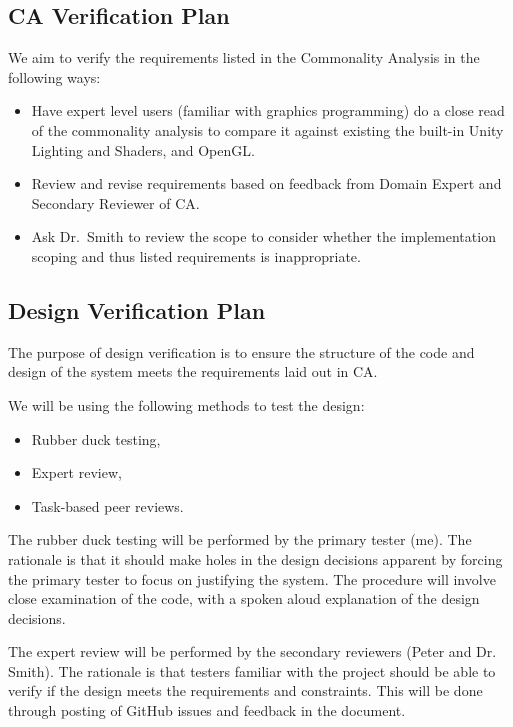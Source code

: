\documentclass[12pt, titlepage]{article}
\begin{document}
\pagebreak
\subsection{CA Verification Plan}

We aim to verify the requirements listed in the Commonality Analysis in the 
following ways:

\begin{itemize}
	\item Have expert level users (familiar with graphics programming) do a 
	close read of the commonality analysis to compare it against existing 
	the built-in Unity Lighting and Shaders, and OpenGL. 
	\item Review and revise requirements based on feedback from Domain Expert 
	and Secondary Reviewer of CA.
      \item Ask Dr.~Smith  to review the scope to consider whether
        the implementation scoping and thus listed requirements is
        inappropriate.
\end{itemize}

\subsection{Design Verification Plan}
The purpose of design verification is to ensure the structure of the code and 
design of the system meets the requirements laid out in CA.

We will be using the following methods to test the design:

\begin{itemize}
	\item Rubber duck testing,
	\item Expert review,
	\item Task-based peer reviews.
\end{itemize}

The rubber duck testing will be performed by the primary tester (me). The 
rationale is that it should make holes in the design decisions apparent by 
forcing the primary tester to focus on justifying the system. The procedure 
will involve close examination of the code, with a spoken aloud explanation of 
the design decisions.

The expert review will be performed by the secondary reviewers (Peter and Dr. 
Smith). The rationale is that testers familiar with the project should be able 
to verify if the design meets the requirements and constraints. This will be 
done through posting of GitHub issues and feedback in the document.
\end{document}
